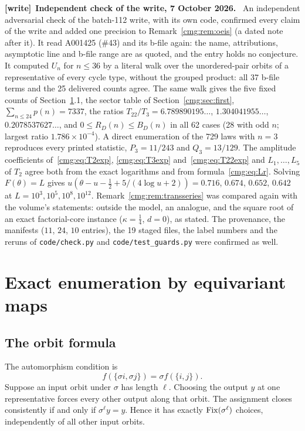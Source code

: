 \documentclass[11pt,letterpaper]{article}
\numberwithin{equation}{section}
\theoremstyle{definition}\newtheorem{definition}[theorem]{Definition}
\theoremstyle{remark}\newtheorem{remark}[theorem]{Remark}
\newcommand{\file}[1]{\nolinkurl{#1}}
\newenvironment{writenote}[1][]{\par\smallskip\begingroup\small
 \noindent\textbf{[write]}\if\relax\detokenize{#1}\relax\else~\textbf{#1.}\fi\ }%
 {\par\endgroup\smallskip}
\begin{document}
\begin{writenote}[Independent check of the write, 7 October 2026]
An independent adversarial check of the batch-112 write, with its own code,
confirmed every claim of the write and added one precision to
Remark~\ref{cmg:rem:oeis} (a dated note after it). It read A001425 (\#43) and
its b-file again: the name, attributions, asymptotic line and b-file range are
as quoted, and the entry holds no conjecture. It computed $U_n$ for
$n\le36$ by a literal walk over the unordered-pair orbits of a representative
of every cycle type, without the grouped product: all 37 b-file terms and the
25 delivered counts agree. The same walk gives the five fixed counts of
Section~\ref{cmg:sec:exact}.1, the sector table of
Section~\ref{cmg:sec:first}, $\sum_{n\le24}p(n)=7337$, the ratios
$T_{22}/T_3=6.789890195\ldots$, $1.304041955\ldots$, $0.2078537627\ldots$, and
$0\le R_D(n)\le B_D(n)$ in all 62 cases (28 with odd $n$; largest ratio
$1.786\times10^{-4}$). A direct enumeration of the 729 laws with $n=3$
reproduces every printed statistic, $P_3=11/243$ and $Q_3=13/129$. The
amplitude coefficients of~\eqref{cmg:eq:T2exp}, \eqref{cmg:eq:T3exp}
and~\eqref{cmg:eq:T22exp} and $L_1,\ldots,L_5$ of $T_2$ agree both from the
exact logarithms and from formula~\eqref{cmg:eq:Lr}. Solving $F(\theta)=L$
gives $u(\theta-u-\frac12+5/(4\log u+2))=0.716$, $0.674$, $0.652$, $0.642$ at
$L=10^3,10^5,10^8,10^{12}$. Remark~\ref{cmg:rem:transseries} was compared
again with the volume's statements: outside the model, an analogue, and the
square root of an exact factorial-core instance ($\kappa=\frac14$, $d=0$), as
stated. The provenance, the manifests ($11$, $24$, $10$ entries), the 19 staged
files, the label numbers and the reruns of \file{code/check.py} and
\file{code/test_guards.py} were confirmed as well.
\end{writenote}

\section{Exact enumeration by equivariant maps}\label{cmg:sec:exact}
\subsection{The orbit formula}
The automorphism condition is
\begin{equation}\label{cmg:eq:equivariant}
 f(\{\sigma i,\sigma j\})=\sigma f(\{i,j\}).
\end{equation}
Suppose an input orbit under $\sigma$ has length $\ell$. Choosing the output $y$ at one representative forces every other output along that orbit. The assignment closes consistently if and only if $\sigma^\ell y=y$. Hence it has exactly $\operatorname{Fix}(\sigma^\ell)$ choices, independently of all other input orbits.
\end{document}
